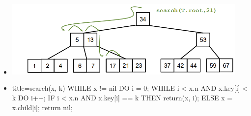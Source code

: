 \documentclass[
    12pt,
    a4paper,
    ngerman,
    color=3b,%
    marginpar=false,
    colorback=false,
    leqno,
]{tudaexercise}
\begin{document}
\begin{itemize}
            \begin{itemize}
                \item[] \includegraphics[width=12cm]{pictures/bbaumSuche.PNG}
                \item[]
                    \begin{ccode}[autogobble]{title={search(x, k)}}
                    WHILE x != nil DO
                        i = 0;
                        WHILE i < x.n AND x.key[i] < k DO
                            i++;
                        IF i < x.n AND x.key[i] == k THEN
                            return(x, i);
                        ELSE
                            x = x.child[i];
                    return nil;
                    \end{ccode}
            \end{itemize}



\end{itemize}
\end{document}
